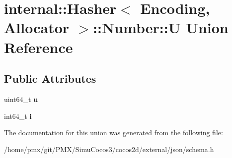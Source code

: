 \hypertarget{unioninternal_1_1Hasher_1_1Number_1_1U}{}\section{internal\+:\+:Hasher$<$ Encoding, Allocator $>$\+:\+:Number\+:\+:U Union Reference}
\label{unioninternal_1_1Hasher_1_1Number_1_1U}
\subsection*{Public Attributes}
\begin{DoxyCompactItemize}
\item 
\mbox{\label{unioninternal_1_1Hasher_1_1Number_1_1U_a6380a48b72a4bb5dd7291d47814e6421}} 
uint64\+\_\+t {\bfseries u}
\item 
\mbox{\label{unioninternal_1_1Hasher_1_1Number_1_1U_a19099b91768e67f02ed5a27fc157974b}} 
int64\+\_\+t {\bfseries i}
\end{DoxyCompactItemize}


The documentation for this union was generated from the following file\+:\begin{DoxyCompactItemize}
\item 
/home/pmx/git/\+P\+M\+X/\+Simu\+Cocos3/cocos2d/external/json/schema.\+h\end{DoxyCompactItemize}
